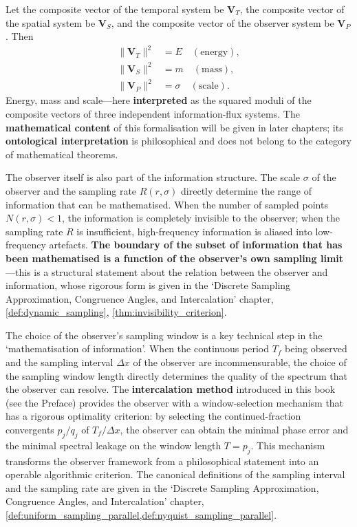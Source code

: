 Let the composite vector of the temporal system be $\mathbf{V}_T$, the composite vector of the spatial system be $\mathbf{V}_S$, and the composite vector of the observer system be $\mathbf{V}_P$. Then
\begin{align}
\|\mathbf{V}_T\|^2 &= E \quad (\text{energy}), \label{eq:energy}\\
\|\mathbf{V}_S\|^2 &= m \quad (\text{mass}), \label{eq:mass}\\
\|\mathbf{V}_P\|^2 &= \sigma \quad (\text{scale}). \label{eq:scale}
\end{align}
Energy, mass and scale---here \textbf{interpreted} as the squared moduli of the composite vectors of three independent information-flux systems. The \textbf{mathematical content} of this formalisation will be given in later chapters; its \textbf{ontological interpretation} is philosophical and does not belong to the category of mathematical theorems.

The observer itself is also part of the information structure. The scale $\sigma$ of the observer and the sampling rate $R(r,\sigma)$ directly determine the range of information that can be mathematised. When the number of sampled points $N(r,\sigma) < 1$, the information is completely invisible to the observer; when the sampling rate $R$ is insufficient, high-frequency information is aliased into low-frequency artefacts. \textbf{The boundary of the subset of information that has been mathematised is a function of the observer's own sampling limit}---this is a structural statement about the relation between the observer and information, whose rigorous form is given in the `Discrete Sampling Approximation, Congruence Angles, and Intercalation' chapter, \cref{def:dynamic_sampling}, \cref{thm:invisibility_criterion}.

The choice of the observer's sampling window is a key technical step in the `mathematisation of information'. When the continuous period $T_f$ being observed and the sampling interval $\Delta x$ of the observer are incommensurable, the choice of the sampling window length directly determines the quality of the spectrum that the observer can resolve. The \textbf{intercalation method} introduced in this book (see the Preface) provides the observer with a window-selection mechanism that has a rigorous optimality criterion: by selecting the continued-fraction convergents $p_j/q_j$ of $T_f/\Delta x$, the observer can obtain the minimal phase error and the minimal spectral leakage on the window length $T = p_j$. This mechanism transforms the observer framework from a philosophical statement into an operable algorithmic criterion. The canonical definitions of the sampling interval and the sampling rate are given in the `Discrete Sampling Approximation, Congruence Angles, and Intercalation' chapter, \cref{def:uniform_sampling_parallel,def:nyquist_sampling_parallel}.


